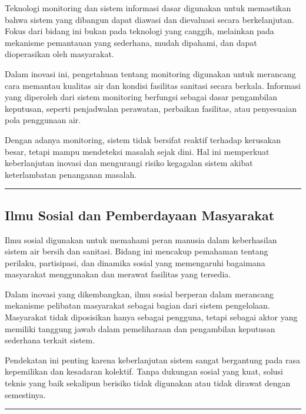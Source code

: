 \documentclass[
  letterpaper,
  DIV=11,
  numbers=noendperiod]{scrreprt}
\begin{document}
Teknologi monitoring dan sistem informasi dasar digunakan untuk
memastikan bahwa sistem yang dibangun dapat diawasi dan dievaluasi
secara berkelanjutan. Fokus dari bidang ini bukan pada teknologi yang
canggih, melainkan pada mekanisme pemantauan yang sederhana, mudah
dipahami, dan dapat dioperasikan oleh masyarakat.

Dalam inovasi ini, pengetahuan tentang monitoring digunakan untuk
merancang cara memantau kualitas air dan kondisi fasilitas sanitasi
secara berkala. Informasi yang diperoleh dari sistem monitoring
berfungsi sebagai dasar pengambilan keputusan, seperti penjadwalan
perawatan, perbaikan fasilitas, atau penyesuaian pola penggunaan air.

Dengan adanya monitoring, sistem tidak bersifat reaktif terhadap
kerusakan besar, tetapi mampu mendeteksi masalah sejak dini. Hal ini
memperkuat keberlanjutan inovasi dan mengurangi risiko kegagalan sistem
akibat keterlambatan penanganan masalah.

\begin{center}\rule{0.5\linewidth}{0.5pt}\end{center}

\subsection{Ilmu Sosial dan Pemberdayaan
Masyarakat}\label{ilmu-sosial-dan-pemberdayaan-masyarakat}

Ilmu sosial digunakan untuk memahami peran manusia dalam keberhasilan
sistem air bersih dan sanitasi. Bidang ini mencakup pemahaman tentang
perilaku, partisipasi, dan dinamika sosial yang memengaruhi bagaimana
masyarakat menggunakan dan merawat fasilitas yang tersedia.

Dalam inovasi yang dikembangkan, ilmu sosial berperan dalam merancang
mekanisme pelibatan masyarakat sebagai bagian dari sistem pengelolaan.
Masyarakat tidak diposisikan hanya sebagai pengguna, tetapi sebagai
aktor yang memiliki tanggung jawab dalam pemeliharaan dan pengambilan
keputusan sederhana terkait sistem.

Pendekatan ini penting karena keberlanjutan sistem sangat bergantung
pada rasa kepemilikan dan kesadaran kolektif. Tanpa dukungan sosial yang
kuat, solusi teknis yang baik sekalipun berisiko tidak digunakan atau
tidak dirawat dengan semestinya.

\begin{center}\rule{0.5\linewidth}{0.5pt}\end{center}
\end{document}
